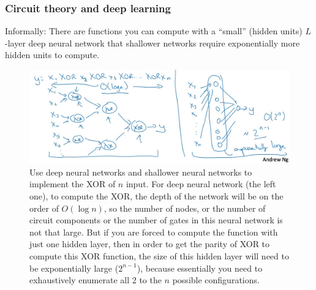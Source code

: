 \documentclass[UTF8]{article}
\begin{document}
\subsubsection{Circuit theory and deep learning}
Informally: There are functions you can compute with a ``small'' (hidden units) $L$-layer deep neural
network that shallower networks require exponentially more hidden units to compute.

\begin{figure}[htb]
    \centering
    \includegraphics[width=40em]{figures/circuit-theory-and-dl}
    \caption{Use deep neural networks and shallower neural networks to implement the XOR of $n$
    input. For deep neural network (the left one), to compute the XOR, the depth of the network
    will be on the order of $O(\log n)$, so the number of nodes, or the number of circuit
    components or the number of gates in this neural network is not that large. But if you are
    forced to compute the function with just one hidden layer, then in order to get the parity
    of XOR to compute this XOR function, the size of this hidden layer will need to be exponentially
    large ($2^{n-1}$), because essentially you need to exhaustively enumerate all 2 to the $n$ possible
    configurations.}
    \label{circuit-theory-and-dl}
\end{figure}
\end{document}
